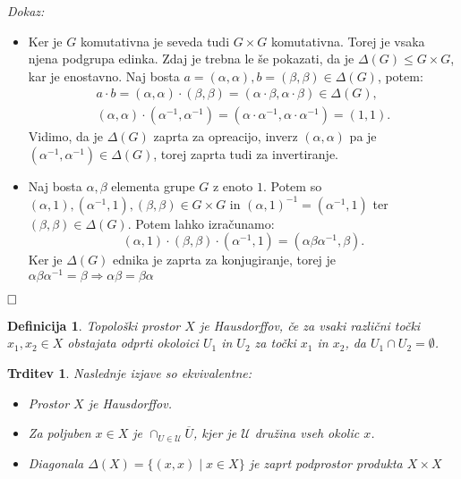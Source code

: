\documentclass[a4paper,12pt]{article}
\def\qed{$\hfill\Box$}   %
\newtheorem{trditev}{Trditev}
\newtheorem{definicija}{Definicija}
\begin{document}
\noindent
{\em Dokaz:\/}
    \begin{itemize}
        \item[($\Rightarrow$)] Ker je $G$ komutativna je seveda tudi $G \times G$ komutativna. Torej je vsaka njena podgrupa edinka.
            Zdaj je trebna le še pokazati, da je $\Delta(G) \le G \times G$, kar je enostavno. Naj bosta $a = (\alpha, \alpha), b = (\beta, \beta) \in \Delta(G)$, potem:
            \begin{gather*}
                a \cdot b = (\alpha, \alpha) \cdot (\beta, \beta) = (\alpha \cdot \beta, \alpha \cdot \beta) \in \Delta(G), \\
                (\alpha, \alpha) \cdot (\alpha^{-1}, \alpha^{-1}) = (\alpha \cdot \alpha^{-1}, \alpha \cdot \alpha^{-1}) = (1,1).
            \end{gather*}
            Vidimo, da je $\Delta(G)$ zaprta za opreacijo, inverz $(\alpha, \alpha)$ pa je $(\alpha^{-1}, \alpha^{-1}) \in \Delta(G)$, torej zaprta tudi za invertiranje.
        \item[($\Leftarrow$)] Naj bosta $\alpha, \beta$ elementa grupe $G$ z enoto $1$.
        Potem so $(\alpha,1), (\alpha^{-1}, 1), (\beta, \beta) \in G \times G$ in
            $(\alpha,1)^{-1} = (\alpha^{-1},1)$ ter $(\beta, \beta) \in \Delta(G)$. Potem lahko izračunamo:
            \[(\alpha,1) \cdot (\beta, \beta) \cdot (\alpha^{-1}, 1) = (\alpha\beta\alpha^{-1}, \beta).\]
            Ker je $\Delta(G)$ ednika je zaprta za konjugiranje, torej je $\alpha\beta\alpha^{-1} = \beta \Rightarrow \alpha\beta = \beta\alpha$
    \end{itemize}
\qed

\begin{definicija}
    Topološki prostor $X$ je Hausdorffov, če za vsaki različni točki $x_1, x_2 \in X$ obstajata odprti okoloici $U_1$ in $U_2$ za točki $x_1$ in $x_2$, da $U_1 \cap U_2 = \emptyset$.
\end{definicija}

\begin{trditev}
    Naslednje izjave so ekvivalentne:
    \begin{itemize}
        \item[\rm (i)] Prostor $X$ je Hausdorffov.
        \item[\rm (ii)] Za poljuben $x \in X$ je $\cap_{U \in \mathcal{U}} \overline{U}$, kjer je $\mathcal{U}$ družina vseh okolic $x$.
        \item[\rm (iii)] Diagonala $\Delta(X) = \{(x,x) \mid x \in X \} $ je zaprt podprostor produkta $X \times X$
    \end{itemize}
\end{trditev}
\end{document}
